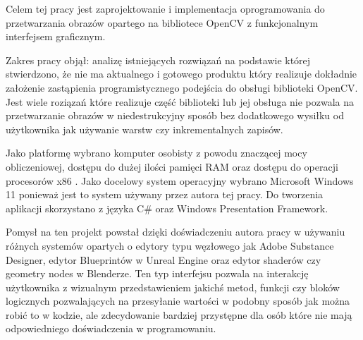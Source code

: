 Celem tej pracy jest zaprojektowanie i implementacja oprogramowania do przetwarzania obrazów opartego na bibliotece OpenCV z funkcjonalnym interfejsem graficznym.

Zakres pracy objął: analizę istniejących rozwiązań na podstawie której stwierdzono, że nie ma aktualnego i gotowego produktu który realizuje dokładnie założenie zastąpienia programistycznego podejścia do obsługi biblioteki OpenCV. Jest wiele roziązań które realizuje część biblioteki lub jej obsługa nie pozwala na przetwarzanie obrazów w niedestrukcyjny sposób bez dodatkowego wysiłku od użytkownika jak używanie warstw czy inkrementalnych zapisów. 

Jako platformę wybrano komputer osobisty z powodu znaczącej mocy obliczeniowej, dostępu do dużej ilości pamięci RAM oraz dostępu do operacji procesorów x86 \cite{x86opencv}. Jako docelowy system operacyjny wybrano Microsoft Windows 11 ponieważ jest to system używany przez autora tej pracy. Do tworzenia aplikacji skorzystano z języka C\# oraz Windows Presentation Framework. 

Pomysł na ten projekt powstał dzięki doświadczeniu autora pracy w używaniu różnych systemów opartych o edytory typu węzłowego jak Adobe Substance Designer, edytor Blueprintów w Unreal Engine oraz edytor shaderów czy geometry nodes w Blenderze. Ten typ interfejsu pozwala na interakcję użytkownika z wizualnym przedstawieniem jakichś metod, funkcji czy bloków logicznych pozwalających na przesyłanie wartości w podobny sposób jak można robić to w kodzie, ale zdecydowanie bardziej przystępne dla osób które nie mają odpowiedniego doświadczenia w programowaniu.  